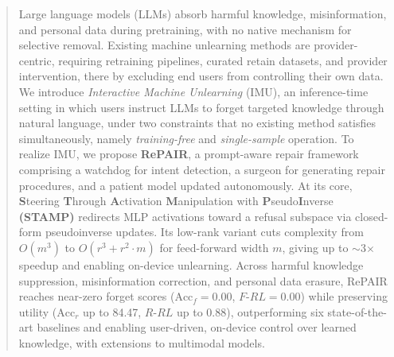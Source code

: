 \begin{abstract}
Large language models (LLMs) absorb harmful knowledge, misinformation, and personal data during pretraining, with no native mechanism for selective removal. Existing machine unlearning methods are provider-centric, requiring retraining pipelines, curated retain datasets, and provider intervention, there by excluding end users from controlling their own data. We introduce \textit{Interactive Machine Unlearning} (IMU), an inference-time setting in which users instruct LLMs to forget targeted knowledge through natural language, under two constraints that no existing method satisfies simultaneously, namely \textit{training-free} and \textit{single-sample} operation. To realize IMU, we propose \textbf{RePAIR}, a prompt-aware repair framework comprising a watchdog for intent detection, a surgeon for generating repair procedures, and a patient model updated autonomously. At its core, \textbf{S}teering \textbf{T}hrough \textbf{A}ctivation \textbf{M}anipulation with \textbf{P}seudo\textbf{I}nverse \textbf{(STAMP)} redirects MLP activations toward a refusal subspace via closed-form pseudoinverse updates. Its low-rank variant cuts complexity from $O(m^3)$ to $O(r^3 + r^2 \cdot m)$ for feed-forward width $m$, giving up to $\sim$3$\times$ speedup and enabling on-device unlearning. Across harmful knowledge suppression, misinformation correction, and personal data erasure, RePAIR reaches near-zero forget scores ($\mathrm{Acc}_f = 0.00$, $F\text{-}RL = 0.00$) while preserving utility ($\mathrm{Acc}_r$ up to 84.47, $R\text{-}RL$ up to 0.88), outperforming six state-of-the-art baselines and enabling user-driven, on-device control over learned knowledge, with extensions to multimodal models.
\end{abstract}
